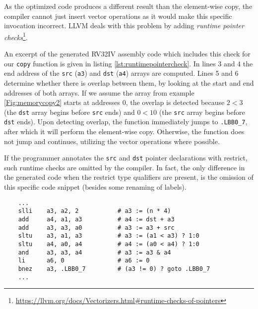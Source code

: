 \newpage

As the optimized code produces a different result than the element-wise copy,
the compiler cannot just insert vector operations as it would make this specific invocation incorrect.
LLVM deals with this problem by adding \textit{runtime pointer checks}\footnote{\url{https://llvm.org/docs/Vectorizers.html\#runtime-checks-of-pointers}}.

An excerpt of the generated RV32IV assembly code which includes this check for our \texttt{copy} function is given in listing \ref{lst:runtimepointercheck}.
In lines 3 and 4 the end address of the \texttt{src} (\texttt{a3}) and \texttt{dst} (\texttt{a4}) arrays are computed.
Lines 5 and 6 determine whether there is overlap between them, by looking at the start and end addresses of both arrays.
If we assume the array from example \ref{Fig:memorycopy2} starts at addresses 0,
the overlap is detected because $2 < 3$ (the \texttt{dst} array begins before \texttt{src} ends)
and $0 < 10$ (the \texttt{src} array begins before \texttt{dst} ends).
Upon detecting overlap, the function immediately jumps to \texttt{.LBB0\_7}, after which it will perform the element-wise copy.
Otherwise, the function does not jump and continues, utilizing the vector operations
where possible.

If the programmer annotates the \texttt{src} and \texttt{dst} pointer declarations
with restrict, such runtime checks are omitted by the compiler.
In fact, the only difference in the generated code
when the restrict type qualifiers are present, is the omission of this specific code snippet (besides some renaming of labels).


\begin{code}
\begin{verbatim}
    ...
    slli    a3, a2, 2           # a3 := (n * 4) 
    add     a4, a1, a3          # a4 := dst + a3
    add     a3, a3, a0          # a3 := a3 + src
    sltu    a3, a1, a3          # a3 := (a1 < a3) ? 1:0
    sltu    a4, a0, a4          # a4 := (a0 < a4) ? 1:0
    and     a3, a3, a4          # a3 := a3 & a4
    li      a6, 0               # a6 := 0
    bnez    a3, .LBB0_7         # (a3 != 0) ? goto .LBB0_7
    ...
\end{verbatim}
\label{lst:runtimepointercheck}
\end{code}



